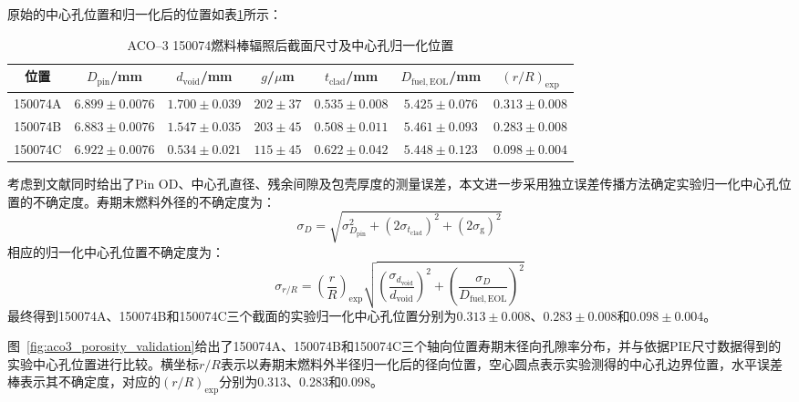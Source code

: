 原始的中心孔位置和归一化后的位置如表\ref{tab:aco3_eol_void_dimension}所示：

\begin{table}[htbp]
	\centering
	\caption{ACO--3 150074燃料棒辐照后截面尺寸及中心孔归一化位置}
	\label{tab:aco3_eol_void_dimension}
	\setlength{\tabcolsep}{4pt}
\begin{tabular}{ccccccc}
		\toprule
		位置 &
		$D_{\mathrm{pin}}$/mm &
		$d_{\mathrm{void}}$/mm &
		$g$/$\mu$m &
		$t_{\mathrm{clad}}$/mm &
		$D_{\mathrm{fuel,EOL}}$/mm &
		$(r/R)_{\mathrm{exp}}$ \\
		\midrule
		150074A &
		$6.899\pm0.0076$ &
		$1.700\pm0.039$ &
		$202\pm37$ &
		$0.535\pm0.008$ &
		$5.425\pm0.076$ &
		$0.313\pm0.008$ \\
		
		150074B &
		$6.883\pm0.0076$ &
		$1.547\pm0.035$ &
		$203\pm45$ &
		$0.508\pm0.011$ &
		$5.461\pm0.093$ &
		$0.283\pm0.008$ \\
		
		150074C &
		$6.922\pm0.0076$ &
		$0.534\pm0.021$ &
		$115\pm45$ &
		$0.622\pm0.042$ &
		$5.448\pm0.123$ &
		$0.098\pm0.004$ \\
		\bottomrule
	\end{tabular}
\end{table}

考虑到文献同时给出了Pin OD、中心孔直径、残余间隙及包壳厚度的测量误差，本文进一步采用独立误差传播方法确定实验归一化中心孔位置的不确定度。寿期末燃料外径的不确定度为：
\begin{equation}
	\sigma_D
	=
	\sqrt{
		\sigma_{D_{\mathrm{pin}}}^{2}
		+(2\sigma_{t_{\mathrm{clad}}})^{2}
		+(2\sigma_{\mathrm g})^{2}
	}
\end{equation}
相应的归一化中心孔位置不确定度为：
\begin{equation}
	\sigma_{r/R}
	=
	\left(\frac{r}{R}\right)_{\mathrm{exp}}
	\sqrt{
		\left(
		\frac{\sigma_{d_{\mathrm{void}}}}
		{d_{\mathrm{void}}}
		\right)^2
		+
		\left(
		\frac{\sigma_D}
		{D_{\mathrm{fuel,EOL}}}
		\right)^2
	}
\end{equation}
最终得到150074A、150074B和150074C三个截面的实验归一化中心孔位置分别为$0.313\pm0.008$、$0.283\pm0.008$和$0.098\pm0.004$。

图~\ref{fig:aco3_porosity_validation}给出了150074A、150074B和150074C三个轴向位置寿期末径向孔隙率分布，并与依据PIE尺寸数据得到的实验中心孔位置进行比较。横坐标$r/R$表示以寿期末燃料外半径归一化后的径向位置，空心圆点表示实验测得的中心孔边界位置，水平误差棒表示其不确定度，对应的$(r/R)_{\mathrm{exp}}$分别为0.313、0.283和0.098。

